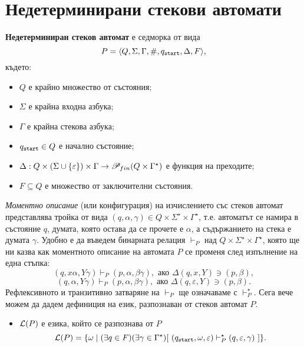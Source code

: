 \section{Недетерминирани стекови автомати}

{\bf Недетерминиран стеков автомат} е седморка от вида
\[P = \langle{Q,\Sigma,\Gamma,\#,q_{\texttt{start}},\Delta,F}\rangle,\] където:
\begin{itemize}
\item
  $Q$ е крайно множество от състояния;
\item  
  $\Sigma$ е крайна входна азбука;
\item
  $\Gamma$ е крайна стекова азбука;
\item
  $q_{\texttt{start}} \in Q$ е начално състояние;
\item
  $\Delta:Q\times(\Sigma \cup \{\varepsilon\})\times\Gamma\rightarrow \mathscr{P}_{fin}(Q\times\Gamma^\star)$ 
  е функция на преходите;    
\item
  $F\subseteq Q$ е множество от заключителни състояния.
\end{itemize}

{\em Моментно описание} (или конфигурация) на изчислението със стеков автомат представлява тройка от вида $(q,\alpha,\gamma) \in Q\times\Sigma^\star\times\Gamma^\star$,
т.е. автоматът се намира в състояние $q$, думата, която остава да се прочете е $\alpha$,
а съдържанието на стека е думата $\gamma$.
Удобно е да въведем бинарната релация $\vdash_P$ над $Q\times\Sigma^\star\times\Gamma^\star$,
която ще ни казва как моментното описание на автомата $P$ се променя след изпълнение на една стъпка:
\[(q,x\alpha,Y\gamma) \vdash_P (p,\alpha,\beta\gamma), \text{ ако } \Delta(q,x,Y) \ni (p,\beta),\]
\[(q,\alpha,Y\gamma) \vdash_P (p,\alpha,\beta\gamma), \text{ ако } \Delta(q,\varepsilon,Y) \ni (p,\beta).\]
Рефлексивното и транзитивно затваряне на $\vdash_P$ ще означаваме с $\vdash^\star_P$.
Сега вече можем да дадем дефиниция на език, разпознаван от стеков автомат $P$.
\begin{itemize}
\item
  $\mathcal{L}(P)$ е езика, който се разпознава от $P$ 
  \[\mathcal{L}(P) = \{\omega \mid (\exists q \in F)(\exists \gamma \in \Gamma^\star)[\ (q_{\texttt{start}},\omega,\varepsilon) \vdash^\star_P (q,\varepsilon,\gamma)\ ]\}.\]    
\end{itemize}

